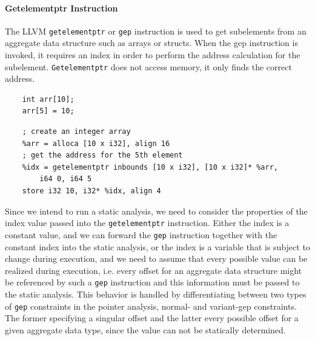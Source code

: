 \paragraph{Getelementptr Instruction}
The LLVM \verb|getelementptr| or \verb|gep| instruction is used to get subelements from an aggregate data structure such as arrays or structs. When the gep instruction is invoked, it requires an index in order to perform the address calculation for the subelement. \verb|Getelementptr| does not access memory, it only finds the correct address.
\begin{verbatim}
    int arr[10];
    arr[5] = 10;
\end{verbatim}
\begin{verbatim}
    ; create an integer array
    %arr = alloca [10 x i32], align 16
    ; get the address for the 5th element
    %idx = getelementptr inbounds [10 x i32], [10 x i32]* %arr, 
        i64 0, i64 5
    store i32 10, i32* %idx, align 4
\end{verbatim}
Since we intend to run a static analysis, we need to consider the properties of the index value passed into the \verb|getelementptr| instruction.
Either the index is a constant value, and we can forward the \verb|gep| instruction together with the constant index into the static analysis,
or the index is a variable that is subject to change during execution, and we need to assume that every possible value can be realized during execution, i.e. every offset for an aggregate data structure might be referenced by such a \verb|gep| instruction and this information must be passed to the static analysis.
This behavior is handled by differentiating between two types of \verb|gep| constraints in the pointer analysis, normal- and variant-gep constraints. The former specifying a singular offset and the latter every possible offset for a given aggregate data type, since the value can not be statically determined.


